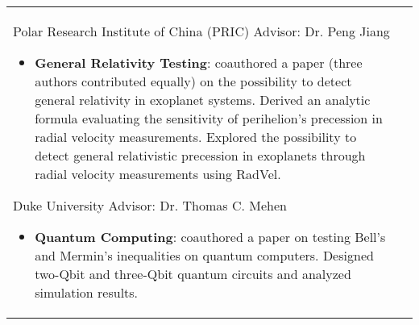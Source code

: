 \documentclass[10pt]{article} %
\begin{document}
\begin{supertabular}{L{4cm}@{\hskip 0.3in}L{13cm}}
{Polar Research Institute of China (PRIC)} %
{Advisor: Dr. Peng Jiang} %
{\begin{itemize}
\vspace{-0.4cm}
    \item \textbf{General Relativity Testing}: coauthored a paper (three authors contributed equally) on the possibility to detect general relativity in exoplanet systems. Derived an analytic formula evaluating the sensitivity of perihelion’s precession in radial velocity measurements. Explored the possibility to detect general relativistic precession in exoplanets through radial velocity measurements using RadVel.
\end{itemize}}
 



{Duke University} %
{Advisor: Dr. Thomas C. Mehen} %
{\begin{itemize}
\vspace{-0.4cm}
 \item \textbf{Quantum Computing}: coauthored a paper on testing  Bell's and Mermin's inequalities on quantum computers. Designed two-Qbit and three-Qbit quantum circuits and analyzed simulation results.
 \end{itemize}}  %


\end{supertabular}

\vspace*{1mm} %
\end{document}
